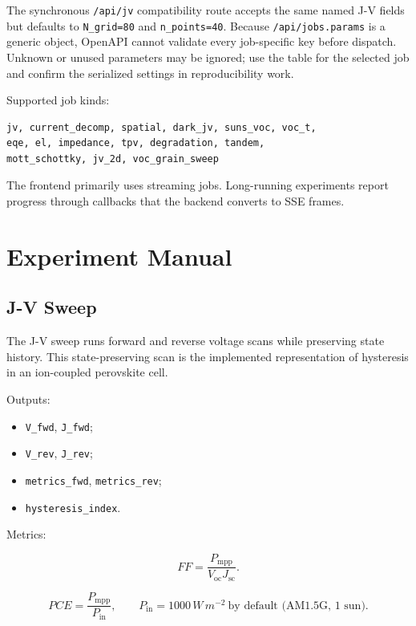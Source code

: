 \documentclass[
  11pt,
  american,
]{report}
\providecommand{\tightlist}{%
  \setlength{\itemsep}{0pt}\setlength{\parskip}{0pt}}
\begin{document}
The synchronous \texttt{/api/jv} compatibility route accepts the same
named J-V fields but defaults to \texttt{N\_grid=80} and
\texttt{n\_points=40}. Because \texttt{/api/jobs.params} is a generic
object, OpenAPI cannot validate every job-specific key before dispatch.
Unknown or unused parameters may be ignored; use the table for the
selected job and confirm the serialized settings in reproducibility
work.

Supported job kinds:

\begin{verbatim}
jv, current_decomp, spatial, dark_jv, suns_voc, voc_t,
eqe, el, impedance, tpv, degradation, tandem,
mott_schottky, jv_2d, voc_grain_sweep
\end{verbatim}

The frontend primarily uses streaming jobs. Long-running experiments
report progress through callbacks that the backend converts to SSE
frames.

\hypertarget{experiment-manual}{%
\chapter{Experiment Manual}\label{experiment-manual}}

\hypertarget{j-v-sweep}{%
\section{J-V Sweep}\label{j-v-sweep}}

The J-V sweep runs forward and reverse voltage scans while preserving
state history. This state-preserving scan is the implemented
representation of hysteresis in an ion-coupled perovskite cell.

Outputs:

\begin{itemize}
\tightlist
\item
  \texttt{V\_fwd}, \texttt{J\_fwd};
\item
  \texttt{V\_rev}, \texttt{J\_rev};
\item
  \texttt{metrics\_fwd}, \texttt{metrics\_rev};
\item
  \texttt{hysteresis\_index}.
\end{itemize}

Metrics:

\[
FF=\frac{P_\mathrm{mpp}}{V_\mathrm{oc}J_\mathrm{sc}}.
\]

\[
PCE=\frac{P_\mathrm{mpp}}{P_\mathrm{in}},
\qquad
P_\mathrm{in} = 1000\,W\,m^{-2}\ \text{by default (AM1.5G, 1 sun)}.
\]
\end{document}
